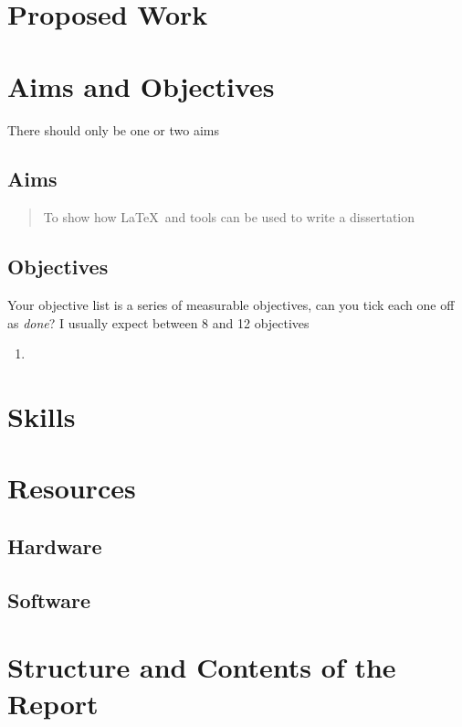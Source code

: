 \section{Proposed Work}
\label{proposed}

\section{Aims and Objectives}
There should only be one or two aims
\subsection{Aims}
\begin{quote}
	To show how \LaTeX\ and tools can be used to write a dissertation
\end{quote}

\subsection{Objectives}
Your objective list is a series of measurable objectives, can you tick each one off as \emph{done}?  I usually expect between 8 and 12 objectives

\begin{enumerate}
    \item 
\end{enumerate}

\section{Skills}
\begin{enumerate}
\end{enumerate}

\section{Resources}

\subsection{Hardware}

\subsection{Software}

\section{Structure and Contents of the Report}
